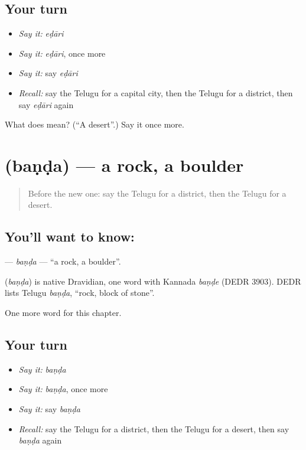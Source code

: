 \subsection*{Your turn}
\begin{itemize}
\raggedright
  \item \emph{Say it:} \emph{eḍāri}
  \item \emph{Say it:} \emph{eḍāri}, once more
  \item \emph{Say it:} say \emph{eḍāri}
  \item \emph{Recall:} say the Telugu for a capital city, then the Telugu for a district, then say \emph{eḍāri} again
\end{itemize}

\begin{tcolorbox}[breakable,colback=teal!4,colframe=teal!35!black,title={Before you move on}]
What does  mean? (\textquotedblleft{}A desert\textquotedblright{}.) Say it once more.
\end{tcolorbox}
\section[\texorpdfstring{\te{బండ} (baṇḍa)}{బండ (baṇḍa)}]{ (baṇḍa) — a rock, a boulder}

\label{lesson:TE-C215-banda}



\begin{quote}
Before the new one: say the Telugu for a district, then the Telugu for a desert.
\end{quote}

\subsection*{You'll want to know: }
\textbf{} — \emph{baṇḍa} — \textquotedblleft{}a rock, a boulder\textquotedblright{}.

\begin{cousinweb}
\textbf{} (\emph{baṇḍa}) is native Dravidian, one word with Kannada \emph{baṇḍe} (DEDR 3903). DEDR lists Telugu \emph{baṇḍa}, \textquotedblleft{}rock, block of stone\textquotedblright{}.
\end{cousinweb}

\begin{grammarlens}[title={What you've built}]
One more word for this chapter.
\end{grammarlens}

\subsection*{Your turn}
\begin{itemize}
\raggedright
  \item \emph{Say it:} \emph{baṇḍa}
  \item \emph{Say it:} \emph{baṇḍa}, once more
  \item \emph{Say it:} say \emph{baṇḍa}
  \item \emph{Recall:} say the Telugu for a district, then the Telugu for a desert, then say \emph{baṇḍa} again
\end{itemize}

